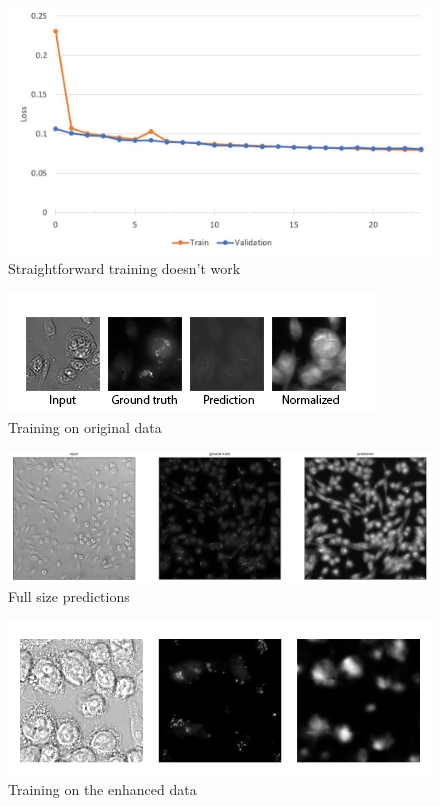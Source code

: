 
\begin{figure}[H]
	\begin{center}
		\includegraphics[width=0.5\linewidth]{bilder/golgi/pcc-no-reg.jpg}
		\caption{Straightforward training doesn't work}\label{fig:golgi-no-reg-pcc}
	\end{center}
\end{figure}


\begin{figure}[H]
	\begin{center}
		\includegraphics[width=0.8\linewidth]{bilder/golgi/too-dark.png}
		\caption{Training on original data}\label{fig:golgi-no-reg-pcc-predictions}
	\end{center}
\end{figure}

\begin{figure}[H]
	\begin{center}
		\includegraphics[width=0.8\linewidth]{bilder/golgi/full-img.png}
		\caption{Full size predictions}\label{fig:golgi-no-reg-pcc-predictions-full}
	\end{center}
\end{figure}

\begin{figure}[H]
	\begin{center}
		\includegraphics[width=0.5\linewidth]{bilder/golgi/enhanced-crop.png}
		\caption{Training on the enhanced data}\label{fig:golgi-enhanced-predictions}
	\end{center}
\end{figure}